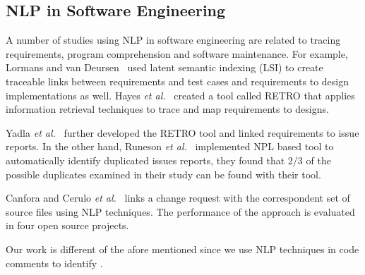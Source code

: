 \subsection{NLP in Software Engineering}

A number of studies using NLP in software engineering are related to tracing requirements, program comprehension and software maintenance. 
For example, Lormans and van Deursen~\cite{Lormans2006CSRM} used latent semantic indexing (LSI) to create traceable links between requirements and test cases and requirements to design implementations as well. Hayes \textit{et al.}~\cite{Hayes2005, Hayes2006TSE} created a tool called RETRO that applies information retrieval techniques to trace and map requirements to designs. 

Yadla \textit{et al.}~\cite{yadla2005tracing} further developed the RETRO tool and linked requirements to issue reports. In the other hand, Runeson \textit{et al.}~\cite{Runeson2007ICSE} implemented NPL based tool to automatically identify duplicated issues reports, they found that 2/3 of the possible duplicates examined in their study can be found with their tool. 

Canfora and Cerulo \textit{et al.}~\cite{Canfora2005ISSM} links a change request with the correspondent set of source files using NLP techniques. The performance of the approach is evaluated in four open source projects.  

Our work is different of the afore mentioned since we use NLP techniques in code comments to identify \SATD.





